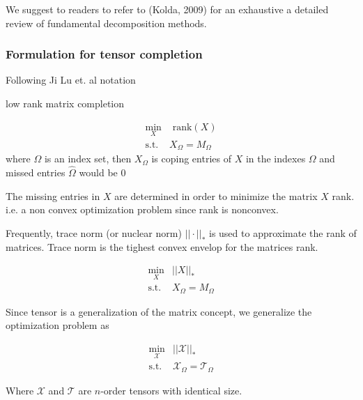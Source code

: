 \documentclass[letterpaper,12pt]{article}
\begin{document}


We suggest to readers to refer to (Kolda, 2009) for an exhaustive a detailed 
review of fundamental decomposition methods.



\subsubsection{Formulation for tensor completion}

Following Ji Lu et. al notation

low rank matrix completion

\begin{equation} 
 \begin{split}
  \min_X & \text{ rank}(X)\\
  \text{s.t. } & X_\Omega = M_\Omega
 \end{split}
\end{equation}
where $\Omega$ is an index set, then $X_\Omega$ is coping entries of $X$ in the 
indexes $\Omega$ and missed entries $\hat{\Omega}$ would be $0$

The missing entries in $X$ are determined in order to minimize the matrix $X$ 
rank. i.e. a non convex optimization problem since rank is nonconvex.

Frequently, trace norm (or nuclear norm) $||\cdot ||_*$ is used to approximate 
the rank of matrices.
Trace norm is the tighest convex envelop for the matrices rank.

\begin{equation} 
 \begin{split}
  \min_X & ||X||_*\\
  \text{s.t. } & X_\Omega = M_\Omega
 \end{split}
\end{equation}

Since tensor is a generalization of the matrix concept, we generalize the 
optimization problem as

\begin{equation} 
 \begin{split}
  \min_{\mathcal{X}} & ||\mathcal{X}||_*\\
  \text{s.t. } & \mathcal{X}_\Omega = \mathcal{T}_\Omega
 \end{split}
\end{equation}

Where $\mathcal{X}$ and $\mathcal{T}$ are $n$-order tensors with identical size.
\end{document}
